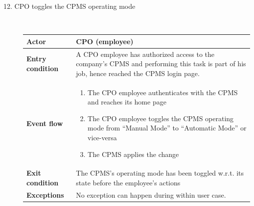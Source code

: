 \documentclass[11pt]{article}
\begin{document}
\begin{description}
    \item [12. CPO toggles the CPMS operating mode] \hfill \\
    \begin{table}[H]
        \centering
        \setlength{\tabcolsep}{18pt}
        \renewcommand{\arraystretch}{1.4}
        \begin{tabularx}{\textwidth}{|>{\hsize=0.5\hsize}X|>{\hsize=1.5\hsize}X|}
            \hline
            \textbf{Actor} & CPO (employee) \\
            \hline
            \textbf{Entry condition} & A CPO employee has authorized access to the company's CPMS and performing this task is part of his job, hence reached the CPMS login page. \\
            \hline
            \textbf{Event flow} & 
                \begin{minipage}[t]{\hsize}
                \begin{enumerate}[topsep=0pt, leftmargin=*]
                    \item The CPO employee authenticates with the CPMS and reaches its home page
                    \item The CPO employee toggles the CPMS operating mode from “Manual Mode” to “Automatic Mode” or vice-versa
                    \item The CPMS applies the change
                \end{enumerate}
                \end{minipage}
                \vspace{6pt}
            \\
            \hline
            \textbf{Exit condition} & The CPMS's operating mode has been toggled w.r.t. its state before the employee's actions \\
            \hline
            \textbf{Exceptions} & No exception can happen during within user case. \\
            \hline
        \end{tabularx}
    \end{table}
    
    \newpage
    

\end{description}
\end{document}
